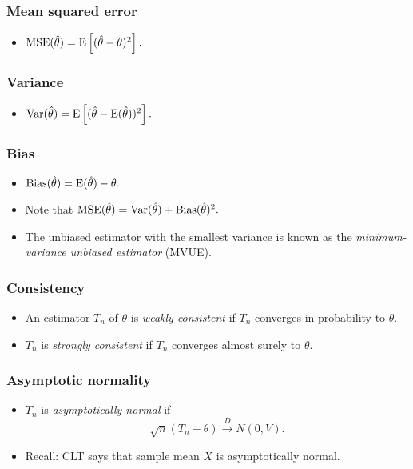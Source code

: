 \documentclass[../ds]{subfiles}
\begin{document}
\subsubsection{Mean squared error}
\begin{itemize}
	\item $\operatorname{MSE}(\hat{\theta}) = \operatorname{E}\left[(\hat{\theta}-\theta)^2\right].$
\end{itemize}

\subsubsection{Variance}
\begin{itemize}
	\item $\operatorname{Var}(\hat{\theta}) = \operatorname{E}\left[(\hat{\theta} - \operatorname{E}(\hat{\theta}))^2\right].$
\end{itemize}

\subsubsection{Bias}
\begin{itemize}
	\item $\operatorname{Bias}(\hat{\theta}) = \operatorname{E}(\hat{\theta}) - \theta.$
	\item Note that $\operatorname{MSE}(\hat{\theta}) = \operatorname{Var}(\hat{\theta}) + \operatorname{Bias}(\hat{\theta})^2.$
	\item The unbiased estimator with the smallest variance is known as the \textit{minimum-variance unbiased estimator} (MVUE).
\end{itemize}

\subsubsection{Consistency}
\begin{itemize}
	\item An estimator $T_n$ of $\theta$ is \textit{weakly consistent} if $T_n$ converges in probability to $\theta.$
	\item $T_n$ is \textit{strongly consistent} if $T_n$ converges almost surely to $\theta.$
\end{itemize}

\subsubsection{Asymptotic normality}
\begin{itemize}
	\item $T_n$ is \textit{asymptotically normal} if \[ \sqrt{n}(T_n - \theta) \xrightarrow{D} N(0,V). \]
	\item Recall: CLT says that sample mean $\overline{X}$ is asymptotically normal.
\end{itemize}
\end{document}
